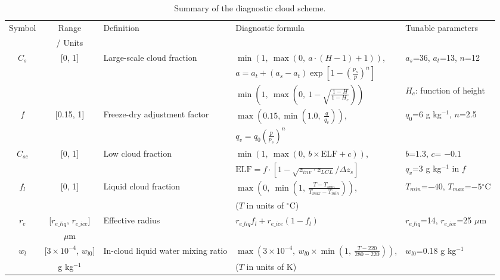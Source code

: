 \begin{table}
	\caption{Summary of the diagnostic cloud scheme.}
	\vspace{0.5em}
	\centering
	\renewcommand{\arraystretch}{1.5}
	\begin{tabular}{c c p{6cm} p{7cm} l} 
		\toprule
			\multirow{2}{*}{Symbol} & Range  & \multirow{2}{*}{Definition} & \multirow{2}{*}{Diagnostic formula} & \multirow{2}{*}{Tunable parameters} \\
			& / Units & & & \\
			\hline
			\multirow{3}{*}{$C_s$} & \multirow{3}{*}{[0, 1]} & \multirow{3}{*}{Large-scale cloud fraction} & $\min\left(1, ~\max \left(0, ~a \cdot (H-1) + 1 \right)\right)$,&  \multirow{2}{*}{$a_s$=36, $a_t$=13, $n$=12} \\
			& &  &	$a=a_t + (a_s-a_t)\exp{\left[1-\left( \frac{p_s}{p} \right)^{n} \right]}$& \\ \cline{4-5}
			& &  &	$\min\left(1, ~\max \left(0, ~1-\sqrt{\frac{1-H}{1-H_{c}}} \right)\right)$ & $H_c$: function of height  \\
			\hline
			\multirow{2}{*}{$f$}  & \multirow{2}{*}{[0.15, 1]} & \multirow{2}{*}{Freeze-dry adjustment factor} & $\max \left(0.15, \min \left(1.0, ~\frac{q}{q_{v}}\right)\right)$, & \multirow{2}{*}{$q_0$=6 g kg$^{-1}$, $n$=2.5} \\
			& & & $q_{v}= q_0\left(\frac{p}{p_s}\right)^n$ & \\
			\hline 
			\multirow{2}{*}{$C_{sc}$} & \multirow{2}{*}{[0, 1]} & \multirow{2}{*}{Low cloud fraction} & $\min(1, ~\max(0, ~b\times \text{ELF} +c))$, & $b$=$1.3$, $c$= $-0.1$  \\
			& & &  $\text{ELF}=f \cdot\left[1-\sqrt{z_{inv} \cdot z_{LCL}}/{\Delta z_{s}}\right]$  & $q_v$=3 g kg$^{-1}$ in $f$ \\
			\hline 
			\multirow{2}{*}{$f_l$} & \multirow{2}{*}{[0, 1]}  & \multirow{2}{*}{Liquid cloud fraction} & $\max\left(0, ~\min\left(1, ~\frac{T-T_{min}}{T_{max}-T_{min}} \right)\right)$, & \multirow{2}{*}{$T_{min}$=$-40$, $T_{max}$=$-5$$^\circ$C} \\
			& & & ($T$ in units of $^\circ$C) & \\
			\multirow{2}{*}{$r_e$} & [$r_{e\_liq}$, $r_{e\_ice}$] & \multirow{2}{*}{Effective radius} & \multirow{2}{*}{$r_{e\_liq}f_l + r_{e\_ice}(1-f_l)$} & \multirow{2}{*}{$r_{e\_liq}$=14, $r_{e\_ice}$=25 $\mu$m} \\
			&  $\mu$m & & & \\
			\hline
			\multirow{2}{*}{$w_l$} & [$3\times 10^{-4}$, $w_{l0}$] & \multirow{2}{*}{In-cloud liquid water mixing ratio} & $\max\left(3\times 10^{-4}, ~w_{l0}\times \min\left(1, ~\frac{T-220}{280-220}\right)\right)$,& \multirow{2}{*}{$w_{l0}$=0.18 g kg$^{-1}$} \\
			& g kg$^{-1}$ & & ($T$ in units of K)  & \\
		\bottomrule
	\end{tabular}
	\label{tab:cld_scheme_summary}
\end{table}

